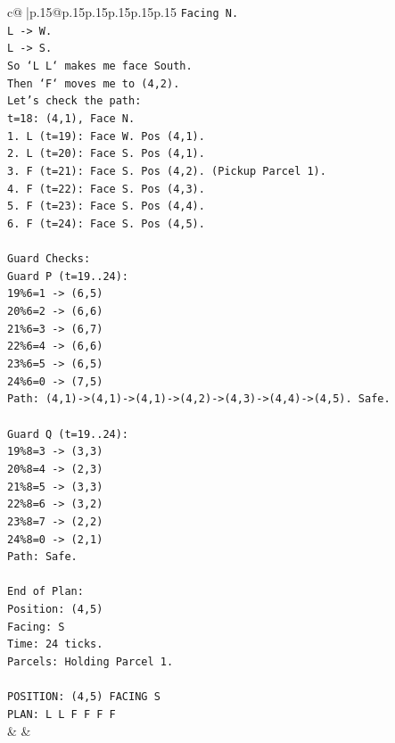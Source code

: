 \documentclass{article}
\begin{document}
{\begin{supertabular}{c@{$\;$}|p{.15\linewidth}@{}p{.15\linewidth}p{.15\linewidth}p{.15\linewidth}p{.15\linewidth}p{.15\linewidth}}
{{{\texttt{Facing N.} \\
\texttt{L {-}> W.} \\
\texttt{L {-}> S.} \\
\texttt{So `L L` makes me face South.} \\
\texttt{Then `F` moves me to (4,2).} \\
\texttt{Let's check the path:} \\
\texttt{t=18: (4,1), Face N.} \\
\texttt{1. L (t=19): Face W. Pos (4,1).} \\
\texttt{2. L (t=20): Face S. Pos (4,1).} \\
\texttt{3. F (t=21): Face S. Pos (4,2). (Pickup Parcel 1).} \\
\texttt{4. F (t=22): Face S. Pos (4,3).} \\
\texttt{5. F (t=23): Face S. Pos (4,4).} \\
\texttt{6. F (t=24): Face S. Pos (4,5).} \\
\\ 
\texttt{Guard Checks:} \\
\texttt{Guard P (t=19..24):} \\
\texttt{19\%6=1 {-}> (6,5)} \\
\texttt{20\%6=2 {-}> (6,6)} \\
\texttt{21\%6=3 {-}> (6,7)} \\
\texttt{22\%6=4 {-}> (6,6)} \\
\texttt{23\%6=5 {-}> (6,5)} \\
\texttt{24\%6=0 {-}> (7,5)} \\
\texttt{Path: (4,1){-}>(4,1){-}>(4,1){-}>(4,2){-}>(4,3){-}>(4,4){-}>(4,5). Safe.} \\
\\ 
\texttt{Guard Q (t=19..24):} \\
\texttt{19\%8=3 {-}> (3,3)} \\
\texttt{20\%8=4 {-}> (2,3)} \\
\texttt{21\%8=5 {-}> (3,3)} \\
\texttt{22\%8=6 {-}> (3,2)} \\
\texttt{23\%8=7 {-}> (2,2)} \\
\texttt{24\%8=0 {-}> (2,1)} \\
\texttt{Path: Safe.} \\
\\ 
\texttt{End of Plan:} \\
\texttt{Position: (4,5)} \\
\texttt{Facing: S} \\
\texttt{Time: 24 ticks.} \\
\texttt{Parcels: Holding Parcel 1.} \\
\\ 
\texttt{POSITION: (4,5) FACING S} \\
\texttt{PLAN: L L F F F F} \\
            }
        }
    }
    & & \\ \\


\end{supertabular}}
\end{document}
